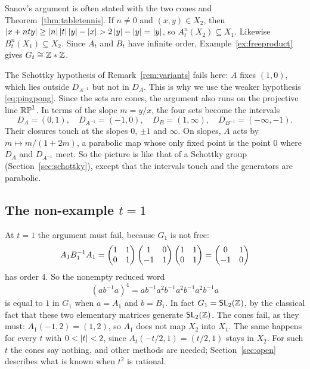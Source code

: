 \begin{remark}\label{rem:two-cones}
Sanov's argument is often stated with the two cones and
Theorem~\ref{thm:tabletennis}. If $n \ne 0$ and $(x,y) \in X_2$, then
$\left|x + nty\right| \ge \left|n\right|\left|t\right|\left|y\right| - \left|x\right| > 2\left|y\right| - \left|y\right| = \left|y\right|$,
so $A_t^n(X_2) \subseteq X_1$. Likewise $B_t^n(X_1) \subseteq X_2$. Since
$A_t$ and $B_t$ have infinite order, Example~\ref{ex:freeproduct} gives
$G_t \cong \mathbb{Z} * \mathbb{Z}$.
\end{remark}

\begin{remark}\label{rem:schottky-fails}
The Schottky hypothesis of Remark~\ref{rem:variants} fails here: $A$ fixes
$(1,0)$, which lies outside $D_{A^{-1}}$ but not in $D_A$. This is why we use
the weaker hypothesis \eqref{eq:pingpong}. Since the sets are cones, the
argument also runs on the projective line $\mathbb{RP}^1$. In terms of the slope
$m = y/x$, the four sets become the intervals
\[
  D_A = (0,1), \quad D_{A^{-1}} = (-1,0), \quad D_B = (1,\infty), \quad
  D_{B^{-1}} = (-\infty,-1).
\]
Their closures touch at the slopes $0$, $\pm1$ and $\infty$. On slopes, $A$
acts by $m \mapsto m/(1+2m)$, a parabolic map whose only fixed point is the
point $0$ where $D_A$ and $D_{A^{-1}}$ meet. So the picture is like that of a
Schottky group (Section~\ref{sec:schottky}), except that the intervals touch
and the generators are parabolic.
\end{remark}

\subsection{The non-example \texorpdfstring{$t = 1$}{t = 1}}
At $t = 1$ the argument must fail, because $G_1$ is not free:
\[
  A_1 B_1^{-1} A_1 = \begin{pmatrix} 1 & 1 \\ 0 & 1\end{pmatrix} \begin{pmatrix} 1 & 0 \\ -1 & 1\end{pmatrix} \begin{pmatrix} 1 & 1 \\ 0 & 1\end{pmatrix}
  = \begin{pmatrix} 0 & 1 \\ -1 & 0\end{pmatrix}
\]
has order $4$. So the nonempty reduced word
\[
  (a b^{-1} a)^4 = a b^{-1} a^2 b^{-1} a^2 b^{-1} a^2 b^{-1} a
\]
is equal to $1$ in $G_1$ when $a = A_1$ and $b = B_1$. In fact $G_1 = \mathsf{SL}_2(\mathbb{Z})$, by the classical fact that these two
elementary matrices generate $\mathsf{SL}_2(\mathbb{Z})$. The cones fail, as they must:
$A_1(-1,2) = (1,2)$, so $A_1$ does not map $X_2$ into $X_1$. The same happens
for every $t$ with $0 < \left|t\right| < 2$, since $A_t(-t/2, 1) = (t/2, 1)$ stays in
$X_2$. For such $t$ the cones say nothing, and other methods are needed;
Section~\ref{sec:open} describes what is known when $t^2$ is rational.
